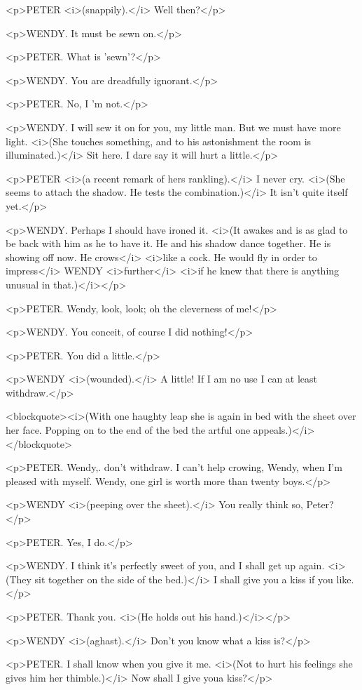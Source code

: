 <p>PETER <i>(snappily).</i> Well then?</p>

<p>WENDY. It must be sewn on.</p>

<p>PETER. What is 'sewn'?</p>

<p>WENDY. You are dreadfully ignorant.</p>

<p>PETER. No, I 'm not.</p>

<p>WENDY. I will sew it on for you, my little man. But we must have more light. <i>(She touches something, and to his astonishment the room is illuminated.)</i> Sit here. I dare say it will hurt a little.</p>

<p>PETER <i>(a recent remark of hers rankling).</i> I never cry. <i>(She seems to attach the shadow. He tests the combination.)</i> It isn't quite itself yet.</p>

<p>WENDY. Perhaps I should have ironed it. <i>(It awakes and is as glad to be back with him as he to have it. He and his shadow dance together. He is showing off now. He crows</i> <i>like a cock. He would fly in order to impress</i> WENDY <i>further</i> <i>if he knew that there is anything unusual in that.)</i></p>

<p>PETER. Wendy, look, look; oh the cleverness of me!</p>

<p>WENDY. You conceit, of course I did nothing!</p>

<p>PETER. You did a little.</p>

<p>WENDY <i>(wounded).</i> A little! If I am no use I can at least withdraw.</p>

<blockquote><i>(With one haughty leap she is again in bed with the sheet over her face. Popping on to the end of the bed the artful one appeals.)</i></blockquote>

<p>PETER. Wendy,. don't withdraw. I can't help crowing, Wendy, when I'm pleased with myself. Wendy, one girl is worth more than twenty boys.</p>

<p>WENDY <i>(peeping over the sheet).</i> You really think so, Peter?</p>

<p>PETER. Yes, I do.</p>

<p>WENDY. I think it's perfectly sweet of you, and I shall get up again. <i>(They sit together on the side of the bed.)</i> I shall give you a kiss if you like.</p>

<p>PETER. Thank you. <i>(He holds out his hand.)</i></p>

<p>WENDY <i>(aghast).</i> Don't you know what a kiss is?</p>

<p>PETER. I shall know when you give it me. <i>(Not to hurt his feelings she gives him her thimble.)</i> Now shall I give youa kiss?</p>

